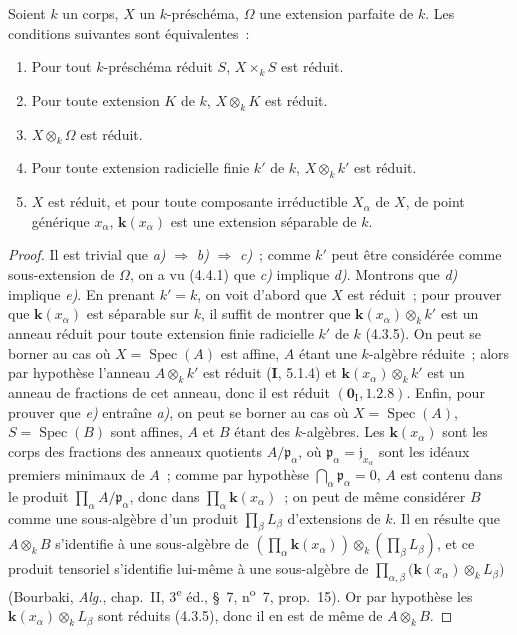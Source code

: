 \begin{proposition}[4.6.1]
\label{IV.2.4.6.1-fr}
Soient $k$ un corps, $X$ un $k$-préschéma, $\Omega$ une extension parfaite de
$k$. Les conditions suivantes sont équivalentes~:
\begin{enumerate}
\item[\textup{a)}] Pour tout $k$-préschéma réduit $S$, $X\times_k S$ est réduit.
\item[\textup{b)}] Pour toute extension $K$ de $k$, $X\otimes_k K$ est réduit.
\item[\textup{c)}] $X\otimes_k\Omega$ est réduit.
\item[\textup{d)}] Pour toute extension radicielle finie $k'$ de $k$, $X\otimes_k k'$ est
réduit.
\item[\textup{e)}] $X$ est réduit, et pour toute composante irréductible $X_\alpha$ de
$X$, de point générique $x_\alpha$, $\boldsymbol{k}(x_\alpha)$ est une extension séparable de
$k$.
\end{enumerate}
\end{proposition}

\begin{proof}
Il est trivial que \emph{a)} $\Rightarrow$ \emph{b)} $\Rightarrow$ \emph{c)}~; comme $k'$ peut être
considérée comme sous-extension de $\Omega$, on a vu (4.4.1) que \emph{c)} implique
\emph{d)}. Montrons que \emph{d)} implique \emph{e)}. En prenant $k'=k$, on voit d'abord que $X$
est réduit~; pour prouver que $\boldsymbol{k}(x_\alpha)$ est séparable sur $k$, il suffit de
montrer que $\boldsymbol{k}(x_\alpha)\otimes_k k'$ est un anneau réduit pour toute extension
finie radicielle $k'$ de $k$ (4.3.5). On peut se borner au cas où
$X=\operatorname{Spec}(A)$ est affine, $A$ étant une $k$-algèbre réduite~; alors
par hypothèse l'anneau $A\otimes_k k'$ est réduit (\textbf{I}, 5.1.4) et
$\boldsymbol{k}(x_\alpha)\otimes_k k'$ est un anneau de fractions de cet anneau, donc il est
réduit $(\mathbf{0}_{\mathrm I},1.2.8)$. Enfin, pour prouver que \emph{e)} entraîne \emph{a)}, on peut
se borner au cas où $X=\operatorname{Spec}(A)$, $S=\operatorname{Spec}(B)$ sont
affines, $A$ et $B$ étant des $k$-algèbres. Les $\boldsymbol{k}(x_\alpha)$ sont les corps des
fractions des anneaux quotients $A/\mathfrak p_\alpha$, où
$\mathfrak p_\alpha=\mathfrak j_{x_\alpha}$ sont les idéaux premiers minimaux de
$A$~; comme par hypothèse $\bigcap_\alpha\mathfrak p_\alpha=0$, $A$ est contenu
dans le produit $\prod_\alpha A/\mathfrak p_\alpha$, donc dans
$\prod_\alpha \boldsymbol{k}(x_\alpha)$~; on peut de même considérer $B$ comme une
sous-algèbre d'un produit $\prod_\beta L_\beta$ d'extensions de $k$. Il en
résulte que $A\otimes_k B$ s'identifie à une sous-algèbre de
$\left(\prod_\alpha \boldsymbol{k}(x_\alpha)\right)\otimes_k
\left(\prod_\beta L_\beta\right)$,
et ce produit tensoriel s'identifie lui-même à une sous-algèbre de
$\prod_{\alpha,\beta}\bigl(\boldsymbol{k}(x_\alpha)\otimes_k L_\beta\bigr)$
(Bourbaki, \emph{Alg.}, chap.~II, 3\textsuperscript{e} éd., \S~7,
n\textsuperscript{o}~7, prop.~15). Or par hypothèse les
$\boldsymbol{k}(x_\alpha)\otimes_k L_\beta$ sont réduits (4.3.5), donc il en est de même de
$A\otimes_k B$.
\end{proof}

